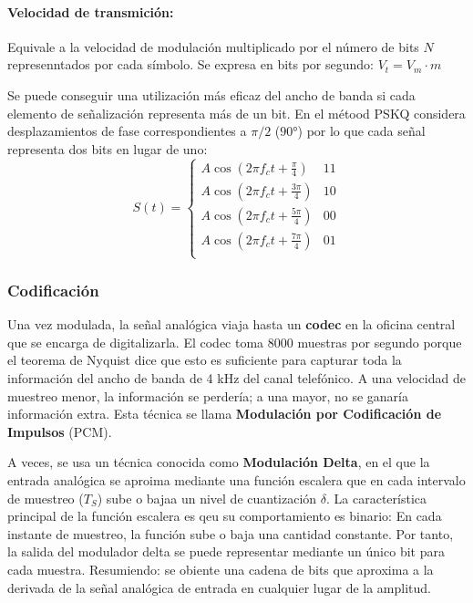 \paragraph{Velocidad de transmición:} Equivale a la velocidad de modulación multiplicado por el número de bits \(N\) represenntados por cada símbolo. Se expresa en bits por segundo: \(V_t = V_m\cdot m\)

Se puede conseguir una utilización más eficaz del ancho de banda si cada elemento de señalización representa más de un bit.  En el métood PSKQ  considera desplazamientos de fase correspondientes a \(\pi/2\) (\(90°\)) por lo que cada señal representa dos bits en lugar de uno:
\[
  S(t) = \begin{cases}
    A\cos(2\pi f_c t + \frac{\pi}{4}) & \text{11} \\
    A\cos(2\pi f_c t + \frac{3\pi}{4}) & \text{10} \\
    A\cos(2\pi f_c t + \frac{5\pi}{4}) & \text{00} \\
    A\cos(2\pi f_c t + \frac{7\pi}{4}) & \text{01} \\
  \end{cases}
\]

\subsubsection{Codificación}
Una vez modulada, la señal analógica viaja hasta un \textbf{codec}  en la oficina central  que se encarga de digitalizarla. El codec toma 8000 muestras por segundo porque el teorema de Nyquist dice que esto es suficiente para capturar toda la información del ancho de banda de 4 kHz del canal telefónico. A una velocidad de muestreo menor, la información se perdería; a una mayor, no se ganaría información extra. Esta técnica se llama \textbf{Modulación por Codificación de Impulsos} (PCM).   

A veces, se usa un técnica conocida como \textbf{Modulación Delta}, en el que la entrada analógica se aproima mediante una función escalera que en cada intervalo de muestreo (\(T_S\)) sube o bajaa un nivel de cuantización \(\delta\). La característica principal de la función escalera es qeu su comportamiento es binario: En cada instante de muestreo, la función sube o baja una cantidad constante. Por tanto, la salida del modulador delta se puede representar mediante un único bit para cada muestra. Resumiendo: se obiente una cadena de bits que aproxima a la derivada de la señal analógica de entrada en cualquier lugar de la amplitud.

